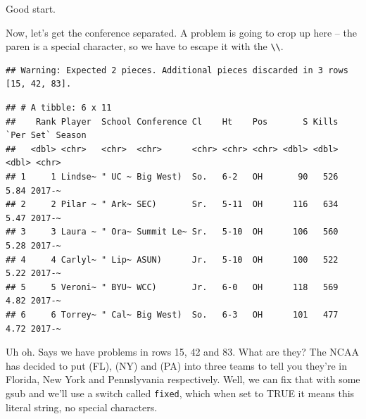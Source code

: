\documentclass[]{book}
\newenvironment{Shaded}{\begin{snugshade}}{\end{snugshade}}
\newcommand{\CharTok}[1]{\textcolor[rgb]{0.31,0.60,0.02}{#1}}
\newcommand{\DataTypeTok}[1]{\textcolor[rgb]{0.13,0.29,0.53}{#1}}
\newcommand{\KeywordTok}[1]{\textcolor[rgb]{0.13,0.29,0.53}{\textbf{#1}}}
\newcommand{\NormalTok}[1]{#1}
\newcommand{\OperatorTok}[1]{\textcolor[rgb]{0.81,0.36,0.00}{\textbf{#1}}}
\newcommand{\StringTok}[1]{\textcolor[rgb]{0.31,0.60,0.02}{#1}}
\begin{document}
Good start.

Now, let's get the conference separated. A problem is going to crop up here -- the paren is a special character, so we have to escape it with the \texttt{\textbackslash{}\textbackslash{}}.

\begin{Shaded}
\end{Shaded}

\begin{verbatim}
## Warning: Expected 2 pieces. Additional pieces discarded in 3 rows [15, 42, 83].
\end{verbatim}

\begin{verbatim}
## # A tibble: 6 x 11
##    Rank Player  School Conference Cl    Ht    Pos       S Kills `Per Set` Season
##   <dbl> <chr>   <chr>  <chr>      <chr> <chr> <chr> <dbl> <dbl>     <dbl> <chr> 
## 1     1 Lindse~ " UC ~ Big West)  So.   6-2   OH       90   526      5.84 2017-~
## 2     2 Pilar ~ " Ark~ SEC)       Sr.   5-11  OH      116   634      5.47 2017-~
## 3     3 Laura ~ " Ora~ Summit Le~ Sr.   5-10  OH      106   560      5.28 2017-~
## 4     4 Carlyl~ " Lip~ ASUN)      Jr.   5-10  OH      100   522      5.22 2017-~
## 5     5 Veroni~ " BYU~ WCC)       Jr.   6-0   OH      118   569      4.82 2017-~
## 6     6 Torrey~ " Cal~ Big West)  So.   6-3   OH      101   477      4.72 2017-~
\end{verbatim}

Uh oh. Says we have problems in rows 15, 42 and 83. What are they? The NCAA has decided to put (FL), (NY) and (PA) into three teams to tell you they're in Florida, New York and Pennslyvania respectively. Well, we can fix that with some gsub and we'll use a switch called \texttt{fixed}, which when set to TRUE it means this literal string, no special characters.
\end{document}
